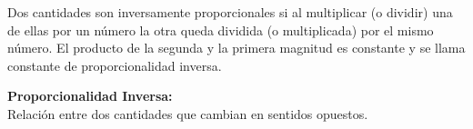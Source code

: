 \documentclass[11pt]{book}
\begin{document}
\vspace{10pt}

\begin{minipage}{0.55\textwidth}
  Dos cantidades son inversamente proporcionales si al multiplicar (o dividir) una de ellas por un número la otra
  queda dividida (o multiplicada) por el mismo número. El producto de la segunda y la primera magnitud es constante
  y se llama constante de proporcionalidad inversa.
\end{minipage}\hfill
\begin{minipage}{0.42\textwidth}
  \begin{boxH}
    \textbf{Proporcionalidad Inversa:}\\ Relaci\'on entre dos cantidades que cambian en sentidos opuestos.
  \end{boxH}
\end{minipage}
\end{document}
